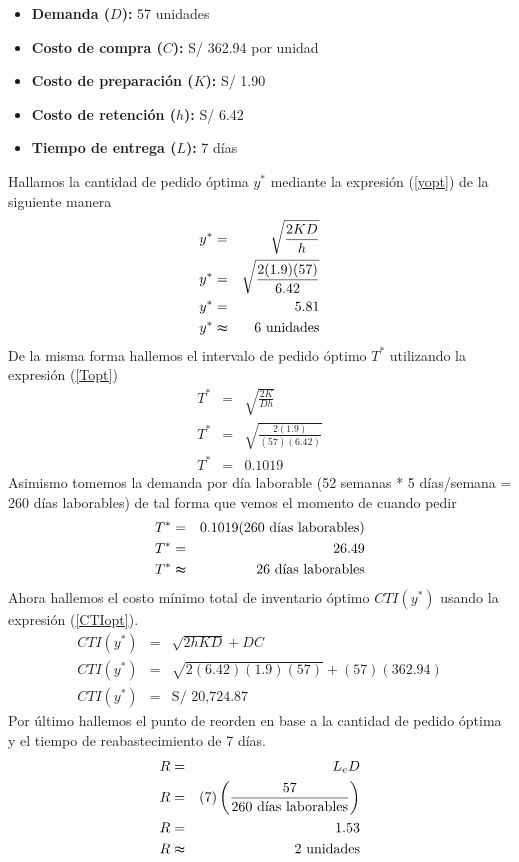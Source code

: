 \begin{itemize}
    \item \textbf{Demanda ($D$):} 57 unidades
    \item \textbf{Costo de compra ($C$):} S/ 362.94 por unidad
    \item \textbf{Costo de preparación ($K$):} S/ 1.90
    \item \textbf{Costo de retención ($h$):} S/ 6.42
    \item \textbf{Tiempo de entrega ($L$):} 7 días
\end{itemize}

Hallamos la cantidad de pedido óptima $y^*$ mediante la expresión (\ref{yopt}) de la siguiente manera
\begin{eqnarray}
    y^* &=& \sqrt{\frac{2KD}{h}} \nonumber \\
    y^* &=& \sqrt{\frac{2(1.9)(57)}{6.42}} \nonumber \\
    y^* &=& 5.81 \nonumber \\
    y^* &\thickapprox& 6 \text{ unidades} \nonumber
\end{eqnarray}
De la misma forma hallemos el intervalo de pedido óptimo $T^*$ utilizando la expresión (\ref{Topt}) 
\begin{eqnarray}
    T^* &=& \sqrt{\frac{2K}{Dh}} \nonumber \\
    T^* &=& \sqrt{\frac{2(1.9)}{(57)(6.42)}} \nonumber \\
    T^* &=& 0.1019 \nonumber
\end{eqnarray}
Asimismo tomemos la demanda por día laborable (52 semanas * 5 días/semana = 260 días laborables) de tal forma que vemos el momento de cuando pedir
\begin{eqnarray}
    T^* &=& 0.1019 (260 \text{ días laborables}) \nonumber \\   
    T^* &=& 26.49 \nonumber \\
    T^* &\thickapprox& 26 \text{ días laborables} \nonumber
\end{eqnarray}
Ahora hallemos el costo mínimo total de inventario óptimo $CTI(y^*)$ usando la expresión (\ref{CTIopt}).
\begin{eqnarray}
    CTI(y^*) &=& \sqrt{2hKD} + DC \nonumber \\
    CTI(y^*) &=& \sqrt{2(6.42)(1.9)(57)} + (57)(362.94) \nonumber \\
    CTI(y^*) &=& \text{S/ 20,724.87} \nonumber
\end{eqnarray}
Por último hallemos el punto de reorden en base a la cantidad de pedido óptima y el tiempo de reabastecimiento de 7 días.
\begin{eqnarray}
    R &=& L_e D \nonumber \\
    R &=& (7) \left(\frac{57}{260 \text{ días laborables}} \right) \nonumber \\
    R &=& 1.53 \nonumber \\
    R &\thickapprox& 2 \text{ unidades} \nonumber
\end{eqnarray}

